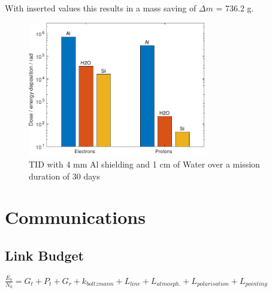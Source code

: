 With inserted values this results in a mass saving of \(\Delta m\) = 736.2 g.

\begin{figure}[htp]
	\centering
	\includegraphics[width=0.7\textwidth]{Media/J_Improvements_Ice}
	\caption{TID with 4 mm Al shielding and 1 cm of Water over a mission duration of 30 days}
	\label{fig:Radiation_Improvements_Ice}
\end{figure}


\clearpage


\section{Communications} 
\label{sec:AppendixCOM}

\subsection{Link Budget}

${\frac{{E}_{b}}{{N}_{0}} = {G}_{t} + {P}_{t} + {G}_{r} + {k}_{boltzmann} + {L}_{line} + {L}_{atmosph.} + {L}_{polarisation} + {L}_{pointing}}$




\cleardoublepage

